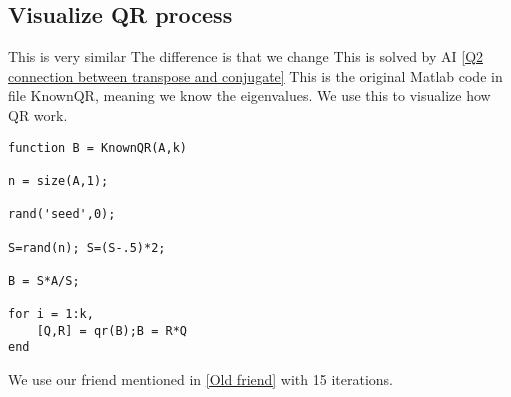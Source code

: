 \subsection{Visualize QR process}
This is very similar The difference is that we change 
 This is solved by AI \ref{Q2 connection between transpose and conjugate}
This is the original Matlab code in file KnownQR, meaning we know the eigenvalues. We use this to visualize how QR work.
\begin{verbatim}
function B = KnownQR(A,k)

n = size(A,1);

rand('seed',0);

S=rand(n); S=(S-.5)*2;

B = S*A/S;

for i = 1:k,
    [Q,R] = qr(B);B = R*Q
end
\end{verbatim}
We use our friend mentioned in \ref{Old friend} with 15 iterations. 
